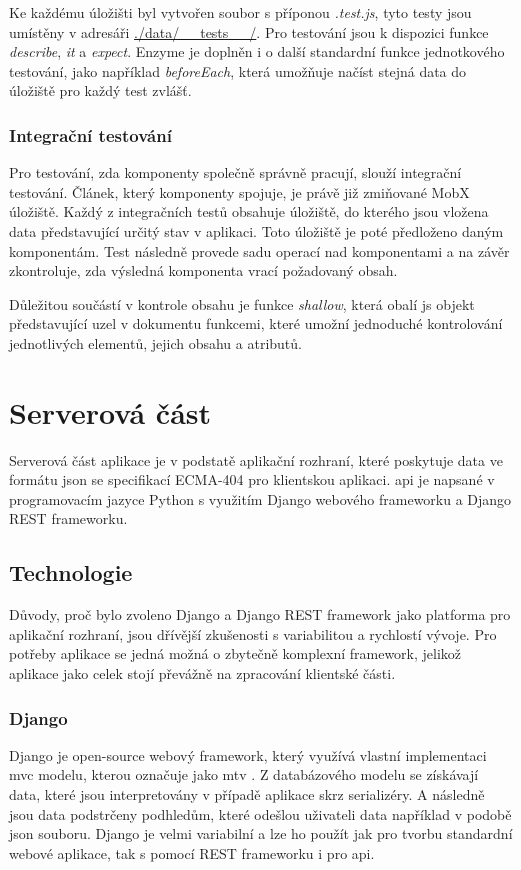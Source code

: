 \documentclass[a4paper,11pt,titlepage,fleqn]{article}
\begin{document}
            Ke každému úložišti byl vytvořen soubor s příponou \textit{.test.js}, tyto testy jsou umístěny v adresáři \url{./data/__tests__/}. Pro testování jsou k dispozici funkce \textit{describe}, \textit{it} a \textit{expect}. Enzyme je doplněn i o další standardní funkce jednotkového testování, jako například \textit{beforeEach}, která umožňuje načíst stejná data do úložiště pro každý test zvlášť.

        \subsubsection{Integrační testování}
            Pro testování, zda komponenty společně správně pracují, slouží integrační testování. Článek, který komponenty spojuje, je právě již zmiňované MobX úložiště. Každý z integračních testů obsahuje úložiště, do kterého jsou vložena data představující určitý stav v aplikaci. Toto úložiště je poté předloženo daným komponentám. Test následně provede sadu operací nad komponentami a na závěr zkontroluje, zda výsledná komponenta vrací požadovaný obsah.

            Důležitou součástí v kontrole obsahu je funkce \textit{shallow}, která obalí \gls{js} objekt představující uzel v dokumentu funkcemi, které umožní jednoduché kontrolování jednotlivých elementů, jejich obsahu a atributů.

\newpage
\section{Serverová část}
    Serverová část aplikace je v podstatě aplikační rozhraní, které poskytuje data ve formátu \gls{json} se specifikací ECMA-404 pro klientskou aplikaci. \gls{api} je napsané v programovacím jazyce Python s využitím Django webového frameworku a Django REST frameworku.
    
    \subsection{Technologie}
        Důvody, proč bylo zvoleno Django a Django REST framework jako platforma pro aplikační rozhraní, jsou dřívější zkušenosti s variabilitou a rychlostí vývoje. Pro potřeby aplikace se jedná možná o zbytečně komplexní framework, jelikož aplikace jako celek stojí převážně na zpracování klientské části.

        \subsubsection{Django}
            Django je open-source webový framework, který využívá vlastní implementaci \gls{mvc} modelu, kterou označuje jako \gls{mtv} \cite{bib:django}. Z databázového modelu se získávají data, které jsou interpretovány v případě aplikace skrz serializéry. A následně jsou data podstrčeny podhledům, které odešlou uživateli data například v podobě \gls{json} souboru. Django je velmi variabilní a lze ho použít jak pro tvorbu standardní webové aplikace, tak s pomocí REST frameworku i pro \gls{api}.
\end{document}
